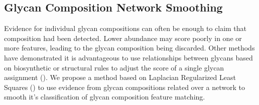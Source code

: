 \subsection{Glycan Composition Network Smoothing}
        Evidence for individual glycan compositions can often be enough to claim
    that composition had been detected. Lower abundance may score poorly in one
    or more features, leading to the glycan composition being discarded. Other
    methods have demonstrated it is advantageous to use relationships between
    glycans based on biosynthetic or structural rules to adjust the score of a
    single glycan assignment (\cite{Goldberg2009, Kronewitter2014}). We propose
    a method based on Laplacian Regularized Least Squares (\cite{Belkin2006}) to
    use evidence from glycan compositions related over a network to smooth it's
    classification of glycan composition feature matching.

    

    

    

    